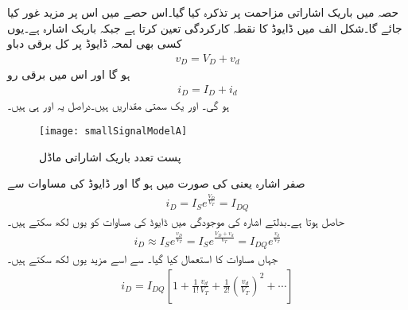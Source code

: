 حصہ   میں باریک اشاراتی مزاحمت  پر تذکرہ کیا گیا۔اس حصے میں اس پر مزید غور کیا جائے گا۔شکل  الف میں   ڈایوڈ کا نقطہ کارکردگی تعین کرتا ہے جبکہ  باریک اشارہ ہے۔یوں کسی بھی لمحہ ڈایوڈ پر کل برقی دباو
\begin{align}
v_D=V_D+v_d
\end{align}
ہو گا اور اس میں برقی رو
\begin{align}
i_D=I_D+i_d
\end{align}
ہو گی۔  اور  یک سمتی مقداریں ہیں۔دراصل یہ  اور  ہی ہیں۔
\begin{figure}
\centering
\texttt{[image: smallSignalModelA]}
\caption{پست تعدد باریک اشاراتی ماڈل}
\label{شکل_باریک_اشاراتی_ماڈل}
\end{figure}
صفر اشارہ یعنی  کی صورت میں  ہو گا اور ڈایوڈ کی مساوات سے
\begin{align} \label{مساوات_ڈایوڈ_صفر_اشارہ_پر_رو}
i_D=I_S e^{\frac{V_D}{V_T}}=I_{DQ}
\end{align}
حاصل ہوتا ہے۔بدلتے اشارہ کی موجودگی میں ڈایوڈ کی مساوات کو یوں لکھ سکتے ہیں۔
\begin{align}
i_D \approx I_S e^{\frac{v_D}{V_T}} = I_S e^{\frac{V_D+v_d}{V_T}}=I_{DQ} e^{\frac{v_d}{V_T}}
\end{align}
جہاں مساوات   کا استعمال کیا گیا۔  سے اسے مزید  یوں لکھ سکتے ہیں۔
\begin{align}
i_D=I_{DQ} \left[1+ \frac{1}{1!} \frac{v_d}{V_T}+ \frac{1}{2!} \left (\frac{v_d}{V_T} \right )^{2} +\cdots \right ]
\end{align}

